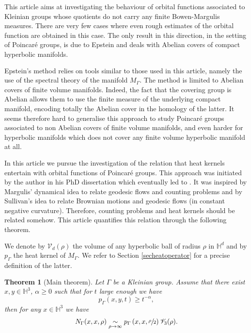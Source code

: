 \documentclass[10pt]{amsart}
\let\mathcal\mathscr
\theoremstyle{plain}
\newtheorem{theoreme}[equation]{Theorem}
\theoremstyle{definition}
\newcommand{\HH}{\mathbb{H}}
\newcommand{\equivaut}[1]{\underset{#1}{\sim}}
\begin{document}
This article aims at investigating the behaviour of orbital functions associated to Kleinian groups whose quotients do not carry any finite Bowen-Margulis measures. There are very few cases where even rough estimates of the orbital function are obtained in this case. The only result in this direction, in the setting of Poincaré groups, is due to Epstein \cite{articleepsteinspectraltheory1, articleepsteinspectraltheory2, articleepsteinspectraltheory3} and deals with Abelian covers of compact hyperbolic manifolds.

Epstein's method relies on tools similar to those used in this article, namely the use of the spectral theory of the manifold $M_{\Gamma}$. The method is limited to Abelian covers of finite volume manifolds. Indeed, the fact that the covering group is Abelian allows them to use the finite measure of the underlying compact manifold, encoding totally the Abelian cover in the homology of the latter. It seems therefore hard to generalise this approach to study Poincaré groups associated to non Abelian covers of finite volume manifolds, and even harder for hyperbolic manifolds which does not cover any finite volume hyperbolic manifold at all.

In this article we pursue the investigation of the relation that heat kernels entertain with orbital functions of Poincaré groups. This approach was initiated by the author in his PhD dissertation \cite{thesemoi} which eventually led to \cite{artmoiheatcounting1}. It was inspired by Margulis' dynamical idea to relate geodesic flows and counting problems and by Sullivan's idea to relate Brownian motions and geodesic flows (in constant negative curvature). Therefore, counting problems and heat kernels should be related somehow. This article quantifies this relation through the following theorem.

We denote by $\mathcal{V}_d(\rho)$ the volume of any hyperbolic ball of radius $\rho$ in $\HH^d$ and by $p_{\Gamma}$ the heat kernel of $M_{\Gamma}$. We refer to Section \ref{secheatoperator} for a precise definition of the latter.


\begin{theoreme}[Main theorem]
\label{maintheo}
Let $\Gamma$ be a Kleinian group. Assume that there exist $x,y \in \mathbb{H}^3$, $\alpha \ge 0$ such that for $t$ large enough we have
\[
p_{\Gamma}(x,y,t) \ge t^{-\alpha},
\]
then for any $x \in \HH^3$ we have
\[
N_{\Gamma}(x,x,\rho) \equivaut{\rho \to \infty} p_{\Gamma} \left(x,x,\sfrac{\rho}{2} \right) \mathcal{V}_3(\rho).
\]
\end{theoreme}
\end{document}
